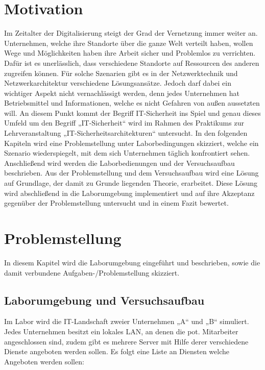 \documentclass[
a4paper,     %
 headsepline, %
footsepline, %
titlepage,   %
 halfparskip,     %
 fleqn,       %
12pt         %
]{scrartcl}  %
\begin{document}
\section{Motivation}
Im Zeitalter der Digitalisierung steigt der Grad der Vernetzung immer weiter an. Unternehmen, welche ihre Standorte über die ganze Welt verteilt haben, wollen Wege und Möglichkeiten haben ihre Arbeit sicher und Problemlos zu verrichten. Dafür ist es unerlässlich, dass verschiedene Standorte auf Ressourcen des anderen zugreifen können. Für solche Szenarien gibt es in der Netzwerktechnik und Netzwerkarchitektur verschiedene Lösungsansätze. 
Jedoch darf dabei ein wichtiger Aspekt nicht vernachlässigt werden, denn jedes Unternehmen hat Betriebsmittel und Informationen, welche es nicht Gefahren von außen aussetzten will. An diesem Punkt kommt der Begriff IT-Sicherheit ins Spiel und genau dieses Umfeld um den Begriff „IT-Sicherheit“ wird im Rahmen des Praktikums zur Lehrveranstaltung „IT-Sicherheitsarchitekturen“ untersucht. 
In den folgenden Kapiteln wird eine Problemstellung unter Laborbedingungen skizziert, welche ein Szenario wiederspiegelt, mit dem sich Unternehmen täglich konfrontiert sehen. Anschließend wird werden die Laborbedienungen und der Versuchsaufbau beschrieben. Aus der Problemstellung und dem Versuchsaufbau wird eine Lösung auf Grundlage, der damit zu Grunde liegenden Theorie, erarbeitet. Diese Lösung wird abschließend in die Laborumgebung implementiert und auf ihre Akzeptanz gegenüber der Problemstellung untersucht und in einem Fazit bewertet.   
\section{Problemstellung}
In diesem Kapitel wird die Laborumgebung eingeführt und beschrieben, sowie die damit verbundene Aufgaben-/Problemstellung skizziert.
\subsection{Laborumgebung und Versuchsaufbau}
\label{laborumgebung}
Im Labor wird die IT-Landschaft zweier Unternehmen „A“ und „B“ simuliert. Jedes Unternehmen besitzt ein lokales LAN, an denen die pot. Mitarbeiter angeschlossen sind, zudem gibt es mehrere Server mit Hilfe derer verschiedene Dienste angeboten werden sollen. 
Es folgt eine Liste an Diensten welche Angeboten werden sollen:
\end{document}
